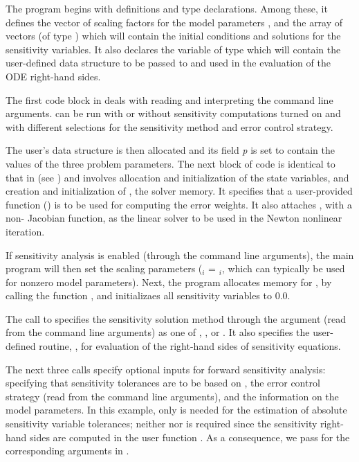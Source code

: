 The  program begins with definitions and type declarations. 
Among these, it defines the vector  of  scaling factors for
the model parameters , and the array  of vectors (of type )
which will contain the initial conditions and solutions for the sensitivity
variables. It also declares the variable  of type  
which will contain the user-defined data structure to be passed to
{\cvodes} and used in the evaluation of the ODE right-hand sides.

The first code block in  deals with reading and interpreting
the command line arguments.  can be run with
or without sensitivity computations turned on and with different
selections for the sensitivity method and error control strategy.

The user's data structure is then allocated and its field {\em p} is set to contain
the values of the three problem parameters.
The next block of code is identical to that in  (see \cite{cvode_ex})
and involves allocation and initialization of the state variables, and creation and 
initialization of , the {\cvodes} solver memory. It specifies that
a user-provided function () is to be used for computing the error weights.
It also attaches {\cvdense}, with a non- Jacobian function, as the linear solver 
to be used in the Newton nonlinear iteration.

If sensitivity analysis is enabled (through the command line arguments), 
the main program will then set the scaling parameters
 ($_i$ = $_i$, which can typically be used for 
nonzero model parameters). 
Next, the program allocates memory for , by calling the {\nvecs} function 
, and initializaes all sensitivity variables to $0.0$.

The call to  specifies the sensitivity solution
method through the argument  (read from the command
line arguments) as one of , ,
or .  It also specifies the user-defined routine, ,
for evaluation of the right-hand sides of sensitivity equations.

The next three calls specify optional inputs for forward sensitivity analysis:
specifying that sensitivity tolerances are to be based on ,
the error control strategy (read from the command line arguments), and
the information on the model parameters.
In this example, only  is needed for the estimation of absolute sensitivity
variable tolerances; neither  nor  is required since the
sensitivity right-hand sides are computed in the user function .  As a consequence,
we pass  for the corresponding arguments in .

